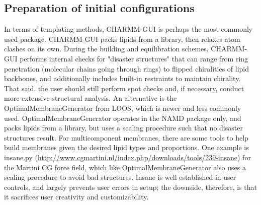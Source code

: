 \documentclass[9pt,bestpractices]{livecoms}
\begin{document}
\subsection{Preparation of initial configurations}
\label{subsec:prepconf4}

\parbox{8.5cm}{\sloppy
In terms of templating methods, CHARMM-GUI is perhaps the most commonly used package.
CHARMM-GUI packs lipids from a library, then relaxes atom clashes on its own.
During the building and equilibration schemes, CHARMM-GUI performs internal checks for "disaster structures" that can range from ring penetration (molecular chains going through rings) to flipped chiralities of lipid backbones, and additionally includes built-in restraints to maintain chirality.
That said, the user should still perform spot checks and, if necessary, conduct more extensive structural analysis.
An alternative is the OptimalMembraneGenerator from LOOS, which is newer and less commonly used.
OptimalMembraneGenerator operates in the NAMD package only, and packs lipids from a library, but uses a scaling procedure such that no disaster structures result.
For multicomponent membranes, there are some tools to help build membranes given the desired lipid types and proportions.
One example is insane.py \cite{Wassenaar2015a} (\url{http://www.cgmartini.nl/index.php/downloads/tools/239-insane}) for the Martini CG force field, which like OptimalMembraneGenerator also uses a scaling procedure to avoid bad structures.
Insane is well established in user controls, and largely prevents user errors in setup; the downside, therefore, is that it sacrifices user creativity and customizability.}
\end{document}
